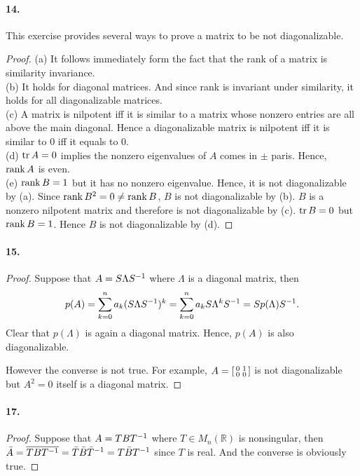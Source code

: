   \paragraph{14.}
    This exercise provides several ways to prove a matrix to be not 
    diagonalizable.
  \begin{proof}
    (a) It follows immediately form the fact that the rank of a matrix is 
    similarity invariance. \\
    (b) It holds for diagonal matrices. And since rank is invariant under 
    similarity, it holds for all diagonalizable matrices.\\
    (c) A matrix is nilpotent iff it is similar to a matrix whose nonzero 
    entries are all above the main diagonal. Hence a diagonalizable matrix is
    nilpotent iff it is similar to $0$ iff it equals to $0$.\\
    (d) $\operatorname{tr} A=0$ implies the nonzero eigenvalues of $A$ comes in $\pm$ paris.
    Hence, $\operatorname{rank} A$ is even.\\
    (e) $\operatorname{rank} B=1$ but it has no nonzero eigenvalue. Hence, it is not 
    diagonalizable by (a). Since $\operatorname{rank} B^2=0\ne \operatorname{rank} B$, $B$ is not 
    diagonalizable by (b). $B$ is a nonzero nilpotent matrix and therefore is 
    not diagonalizable by (c). $\operatorname{tr} B=0$ but $\operatorname{rank} B=1$. Hence $B$ is not 
    diagonalizable by (d).
  \end{proof}

  \paragraph{15.}
  \begin{proof}
    Suppose that $A=S\Lambda S^{-1}$ where $\Lambda$ is a diagonal matrix, then
    \[
      p(A) = \sum_{k=0}^n a_k(S\Lambda S^{-1})^k = 
      \sum_{k=0}^n a_kS\Lambda^kS^{-1} = Sp(\Lambda)S^{-1}.
    \]
    Clear that $p(\Lambda)$ is again a diagonal matrix. Hence, $p(A)$ is also
    diagonalizable. \par
    However the converse is not true. For example, $A = \begin{bsmallmatrix} 
    0 & 1 \\ 0 & 0 \end{bsmallmatrix}$ is not diagonalizable but $A^2 = 0$ 
    itself is a diagonal matrix.
  \end{proof}

  \paragraph{17.}
  \begin{proof}
    Suppose that $A=TBT^{-1}$ where $T\in M_n(\mathbb{R})$ is nonsingular, then
    $\bar{A}=\overline{TBT^{-1}} = \bar{T}\bar{B}\bar{T}^{-1} = T\bar{B}T^{-1}$ 
    since $T$ is real. And the converse is obviously true.
  \end{proof}

